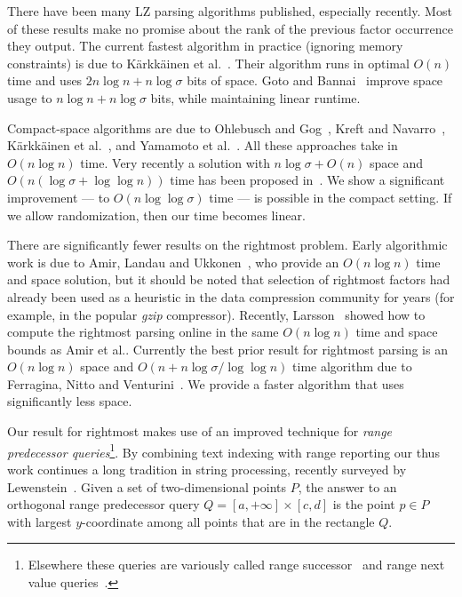 \documentclass[11pt,runningheads]{llncs}
\begin{document}
There have been many LZ parsing algorithms published, especially recently. 
Most of these results make no promise about the rank of the previous factor occurrence they 
output.
The current fastest algorithm in practice (ignoring memory constraints) is due to 
K{\"a}rkk{\"a}inen et al.~\cite{kkp2013}. Their algorithm runs in optimal $O(n)$ time and uses $2n\log n + n\log\sigma$ 
bits of space. Goto and Bannai~\cite{gb2014} improve space usage to $n\log n + n\log\sigma$ 
bits, while maintaining linear runtime.

Compact-space algorithms are due to Ohlebusch and Gog~\cite{og2011}, Kreft and Navarro~\cite{kn2012}, 
K{\"a}rkk{\"a}inen et al.~\cite{kkp2013-sea}, and Yamamoto et al.~\cite{yibit2014}. 
All these approaches
take in $O(n\log n)$ time. Very recently a solution with $n\log\sigma+O(n)$ space and $O(n(\log\sigma+\log\log n))$ time has been proposed in~\cite{kosolobov2015faster}. 
We show a significant improvement --- to $O(n\log\log\sigma)$ time --- is possible in the compact
setting. If we allow randomization, then our time becomes linear. 

There are significantly fewer results on the rightmost problem. Early algorithmic work is
due to Amir, Landau and Ukkonen~\cite{alu2002}, who provide an $O(n\log n)$ time and space
solution, but it should be noted that selection of rightmost factors had already been used as a heuristic in the data
compression community for years (for example, in the popular {\em gzip} compressor). Recently,
Larsson~\cite{l2014} showed how to compute the rightmost parsing online in the same
$O(n\log n)$ time and space bounds as Amir et al.. 
Currently the best prior result for rightmost parsing is an
$O(n\log n)$ space and
$O(n + n\log\sigma/\log\log n)$ time
algorithm due to Ferragina, Nitto and Venturini~\cite{fnv2013}. 
We provide a faster algorithm that uses significantly less space.

Our result for rightmost makes use of an improved technique for 
{\em range predecessor queries}\footnote{Elsewhere these queries are variously called 
range successor~\cite{nn2012} and range next value queries~\cite{CIKRTW12}.}.
By combining text indexing with range reporting our thus work continues a long tradition in string 
processing, recently surveyed by Lewenstein~\cite{l2013}.
Given a set of two-dimensional points $P$, 
the answer to an orthogonal range predecessor query $Q = [a, +\infty]\times[c, d]$
is the point $p \in P$ with largest $y$-coordinate among all points that are in the rectangle
$Q$. 
\end{document}
